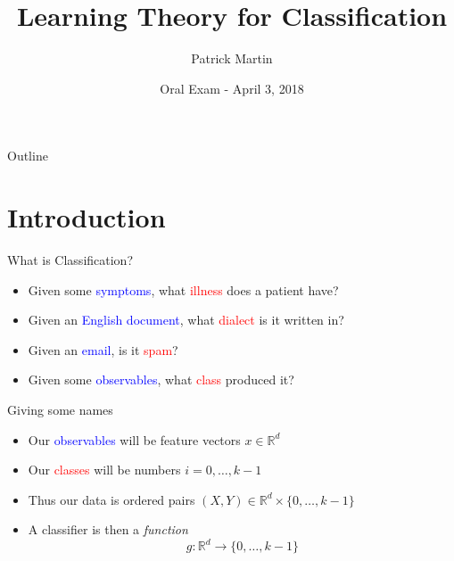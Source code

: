 \documentclass{beamer}
\title %
{Learning Theory for Classification}
\author %
{Patrick Martin}
\institute %
{Department of Mathematics\\
Johns Hopkins University}
\date %
{Oral Exam - April 3, 2018}
\newcommand{\R}{\mathbb{R}}
\begin{document}
\begin{frame}
  \titlepage
\end{frame}

\begin{frame}{Outline}
  \tableofcontents
\end{frame}




\section{Introduction}
\begin{frame}{What is Classification?}
\begin{itemize}
\item Given some \textcolor{blue}{symptoms}, what \textcolor{red}{illness} does a patient have?
\item Given an \textcolor{blue}{English document}, what \textcolor{red}{dialect} is it written in? 
\item Given an \textcolor{blue}{email}, is it \textcolor{red}{spam}?
\item Given some \textcolor{blue}{observables}, what \textcolor{red}{class} produced it?
\end{itemize}
\end{frame}

\begin{frame}{Giving some names}
\begin{itemize}
\item Our \textcolor{blue}{observables} will be feature vectors $x \in \R^d$
\item Our \textcolor{red}{classes} will be numbers $i=0,\ldots,k-1$
\item Thus our data is ordered pairs $(X,Y) \in \R^d \times \{0,\ldots,k-1\}$
\item A classifier is then a \emph{function}
\[ g: \R^d \to \{0,\ldots, k-1\} \]
\end{itemize}
\end{frame}
\end{document}
